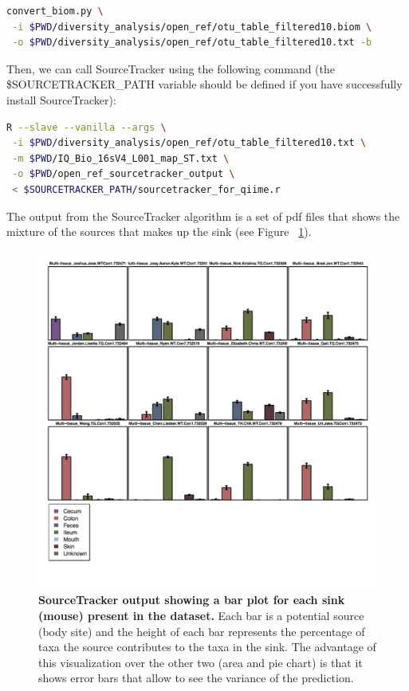 \begin{lstlisting}[language=bash]
convert_biom.py \
 -i $PWD/diversity_analysis/open_ref/otu_table_filtered10.biom \
 -o $PWD/diversity_analysis/open_ref/otu_table_filtered10.txt -b
\end{lstlisting}

Then, we can call SourceTracker using the following command (the \$SOURCETRACKER\_PATH variable should be defined if
you have successfully install SourceTracker):

\begin{lstlisting}[language=bash]
R --slave --vanilla --args \
 -i $PWD/diversity_analysis/open_ref/otu_table_filtered10.txt \
 -m $PWD/IQ_Bio_16sV4_L001_map_ST.txt \
 -o $PWD/open_ref_sourcetracker_output \
 < $SOURCETRACKER_PATH/sourcetracker_for_qiime.r
\end{lstlisting}

The output from the SourceTracker algorithm is a set of pdf files that shows the mixture of
the sources that makes up the sink (see Figure ~\ref{bfigure17}).

\begin{figure}[htbp]
\includegraphics[width=\columnwidth]{chapter_book_figures/Figure_17.jpg}
\caption[SourceTracker output showing a bar plot for each sink (mouse) present in the dataset]{\textbf{SourceTracker output showing a bar plot for each sink (mouse) present in the dataset.}
Each bar is a potential source (body site) and the height of each bar represents the percentage of
taxa the source contributes to the taxa in the sink. The advantage of this visualization over the other
two (area and pie chart) is that it shows error bars that allow to see the variance of the prediction.}
\label{bfigure17}
\end{figure}

